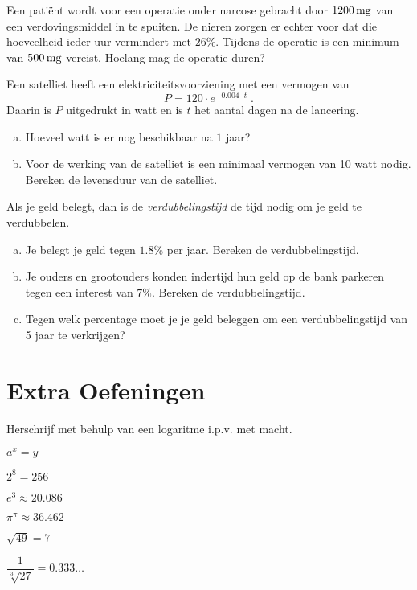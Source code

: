 \documentclass[12pt,twoside,a4paper]{article}
\begin{document}
\begin{oefening}
Een patiënt wordt voor een operatie onder narcose gebracht door $1200 \mg$ van een verdovingsmiddel in te spuiten. De nieren zorgen er echter voor dat die hoeveelheid ieder uur vermindert met $26 \%$. Tijdens de operatie is een minimum van $500 \mg$ vereist. Hoelang mag de operatie duren?
\end{oefening}

\begin{oefening}
Een satelliet heeft een elektriciteitsvoorziening met een vermogen van
$$P=120\cdot e^{-0.004\cdot t}\;.$$
Daarin is $P$ uitgedrukt in watt en is $t$ het aantal dagen na de lancering.
\begin{enumerate}[(a)]
  \item Hoeveel watt is er nog beschikbaar na $1$ jaar?
  \item Voor de werking van de satelliet is een minimaal vermogen van 10 watt nodig. Bereken de levensduur van de satelliet.
\end{enumerate}
\end{oefening}

\begin{oefening}
Als je geld belegt, dan is de {\em verdubbelingstijd} de tijd nodig om je geld te verdubbelen.
\begin{enumerate}[(a)]
  \item Je belegt je geld tegen $1.8 \%$ per jaar. Bereken de verdubbelingstijd.
  \item Je ouders en grootouders konden indertijd hun geld op de bank parkeren tegen een interest van $7 \%$. Bereken de verdubbelingstijd.
  \item Tegen welk percentage moet je je geld beleggen om een verdubbelingstijd van 5 jaar te verkrijgen?
\end{enumerate}
\end{oefening}

\cleardoublepage
\section{Extra Oefeningen}

\begin{oefening}
Herschrijf met behulp van een logaritme i.p.v. met macht.
\begin{exlist}{3}
  \item $a^x=y$
  \item $2^8=256$
  \item $e^3\approx20.086$
  \item $\pi^\pi\approx36.462$
  \item $\sqrt{49}=7$
  \item $\dfrac{1}{\sqrt[3]{27}}=0.333\ldots$
\end{exlist}
\end{oefening}
\end{document}
